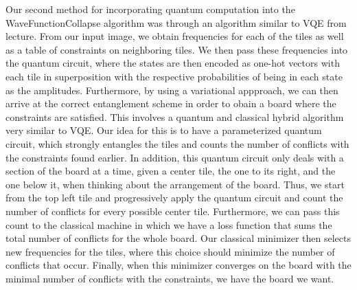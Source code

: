 \documentclass[10pt]{article}
\begin{document}
\indent Our second method for incorporating quantum computation into the WaveFunctionCollapse algorithm was through an algorithm similar to VQE from lecture. From our input image, we obtain frequencies for each of the tiles as well as a table of constraints on neighboring tiles. We then pass these frequencies into the quantum circuit, where the states are then encoded as one-hot vectors with each tile in superposition with the respective probabilities of being in each state as the amplitudes. Furthermore, by using a variational appproach, we can then arrive at the correct entanglement scheme in order to obain a board where the constraints are satisfied. This involves a quantum and classical hybrid algorithm very similar to VQE. Our idea for this is to have a parameterized quantum circuit, which strongly entangles the tiles and counts the number of conflicts with the constraints found earlier. In addition, this quantum circuit only deals with a section of the board at a time, given a center tile, the one to its right, and the one below it, when thinking about the arrangement of the board. Thus, we start from the top left tile and progressively apply the quantum circuit and count the number of conflicts for every possible center tile. Furthermore, we can pass this count to the classical machine in which we have a loss function that sums the total number of conflicts for the whole board. Our classical minimizer then selects new frequencies for the tiles, where this choice should minimize the number of conflicts that occur. Finally, when this minimizer converges on the board with the minimal number of conflicts with the constraints, we have the board we want.

\newpage
\end{document}
